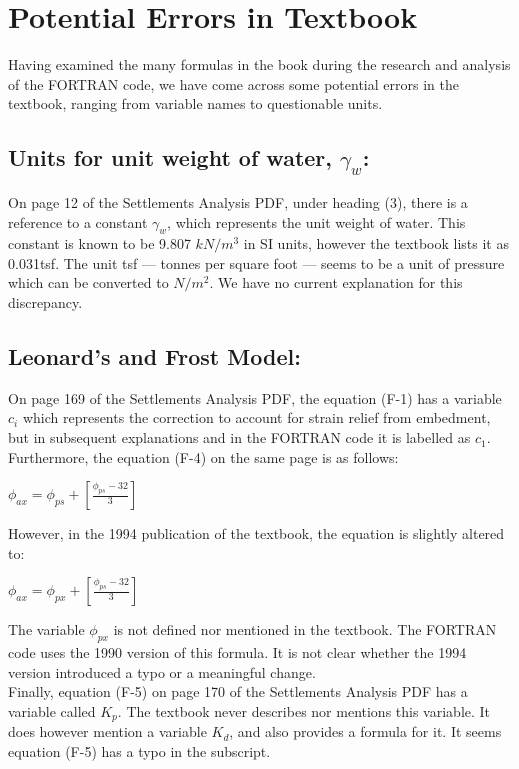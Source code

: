 \documentclass[11pt,fleqn]{article}
\newcommand{\indentpar}{\phantom{=}}
\begin{document}
    \section*{Potential Errors in Textbook}
    \indentpar Having examined the many formulas in the book during the research and 
    analysis of the FORTRAN code, we have come across some potential errors in the
    textbook, ranging from variable names to questionable units.
    \subsection*{Units for unit weight of water, $\gamma_w$:} 
    \indentpar On page 12 of the Settlements Analysis PDF, 
    under heading (3), there is a reference to a constant $\gamma_w$, 
    which represents the unit weight of water. This constant is known
    to be 9.807 $kN/m^3$ in SI units, however the textbook lists it as 
    0.031tsf. The unit tsf — tonnes per square foot — seems to be a unit
    of pressure which can be converted to $N/m^2$. We have no current 
    explanation for this discrepancy.
    \subsection*{Leonard's and Frost Model:}
    \indentpar On page 169 of the Settlements Analysis PDF, 
    the equation (F-1) has a variable $c_i$ which represents 
    the correction to account for strain relief from embedment,
    but in subsequent explanations and in the FORTRAN code it 
    is labelled as $c_1$. \\
    \indentpar Furthermore, the equation (F-4) on the 
    same page is as follows:
    \begin{center}
        $\phi_{ax} = \phi_{ps} + [\frac{\phi_{ps} - 32}{3}]$
    \end{center}
    \indentpar However, in the 1994 publication of the textbook, the equation
    is slightly altered to:
    \begin{center}
        $\phi_{ax} = \phi_{px} + [\frac{\phi_{ps} - 32}{3}]$
    \end{center}
    \indentpar The variable $\phi_{px}$ is not defined nor mentioned in the textbook. 
    The FORTRAN code uses the 1990 version of this formula. It is not clear
    whether the 1994 version introduced a typo or a meaningful change. \\
    \indentpar Finally, equation (F-5) on page 170 of the Settlements 
    Analysis PDF has a variable called $K_p$. The textbook never describes 
    nor mentions this variable. It does however mention a variable $K_d$, and also
    provides a formula for it. It seems equation (F-5) has a typo in the subscript.
     
\end{document}
